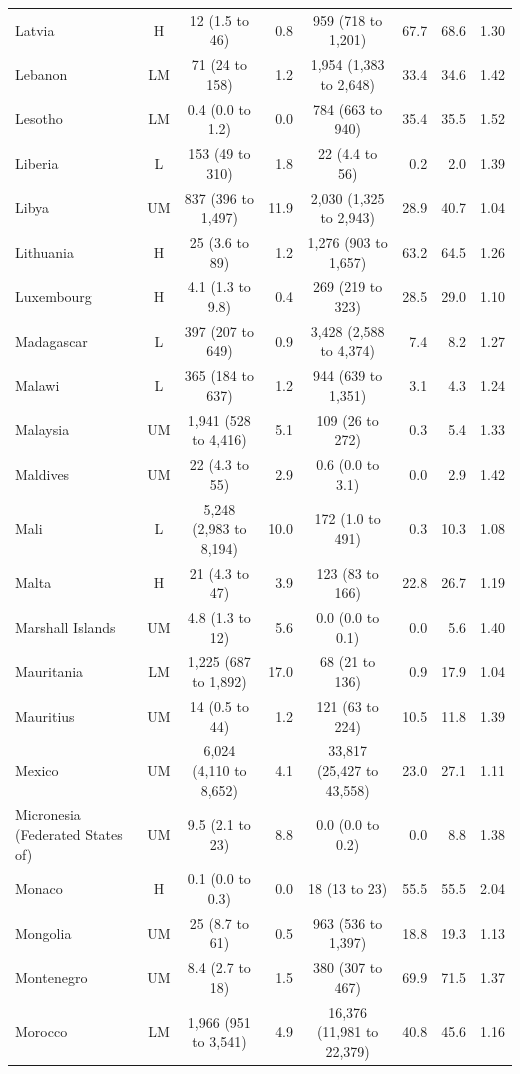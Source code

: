 \begin{longtable}{lccrcrrr}
Latvia & H & 12 (1.5 to 46) & 0.8 & 959 (718 to 1,201) & 67.7 & 68.6 & 1.30 \\
Lebanon & LM & 71 (24 to 158) & 1.2 & 1,954 (1,383 to 2,648) & 33.4 & 34.6 & 1.42 \\
Lesotho & LM & 0.4 (0.0 to 1.2) & 0.0 & 784 (663 to 940) & 35.4 & 35.5 & 1.52 \\
Liberia & L & 153 (49 to 310) & 1.8 & 22 (4.4 to 56) & 0.2 & 2.0 & 1.39 \\
Libya & UM & 837 (396 to 1,497) & 11.9 & 2,030 (1,325 to 2,943) & 28.9 & 40.7 & 1.04 \\
Lithuania & H & 25 (3.6 to 89) & 1.2 & 1,276 (903 to 1,657) & 63.2 & 64.5 & 1.26 \\
Luxembourg & H & 4.1 (1.3 to 9.8) & 0.4 & 269 (219 to 323) & 28.5 & 29.0 & 1.10 \\
Madagascar & L & 397 (207 to 649) & 0.9 & 3,428 (2,588 to 4,374) & 7.4 & 8.2 & 1.27 \\
Malawi & L & 365 (184 to 637) & 1.2 & 944 (639 to 1,351) & 3.1 & 4.3 & 1.24 \\
Malaysia & UM & 1,941 (528 to 4,416) & 5.1 & 109 (26 to 272) & 0.3 & 5.4 & 1.33 \\
Maldives & UM & 22 (4.3 to 55) & 2.9 & 0.6 (0.0 to 3.1) & 0.0 & 2.9 & 1.42 \\
Mali & L & 5,248 (2,983 to 8,194) & 10.0 & 172 (1.0 to 491) & 0.3 & 10.3 & 1.08 \\
Malta & H & 21 (4.3 to 47) & 3.9 & 123 (83 to 166) & 22.8 & 26.7 & 1.19 \\
Marshall Islands & UM & 4.8 (1.3 to 12) & 5.6 & 0.0 (0.0 to 0.1) & 0.0 & 5.6 & 1.40 \\
Mauritania & LM & 1,225 (687 to 1,892) & 17.0 & 68 (21 to 136) & 0.9 & 17.9 & 1.04 \\
Mauritius & UM & 14 (0.5 to 44) & 1.2 & 121 (63 to 224) & 10.5 & 11.8 & 1.39 \\
Mexico & UM & 6,024 (4,110 to 8,652) & 4.1 & 33,817 (25,427 to 43,558) & 23.0 & 27.1 & 1.11 \\
Micronesia (Federated States of) & UM & 9.5 (2.1 to 23) & 8.8 & 0.0 (0.0 to 0.2) & 0.0 & 8.8 & 1.38 \\
Monaco & H & 0.1 (0.0 to 0.3) & 0.0 & 18 (13 to 23) & 55.5 & 55.5 & 2.04 \\
Mongolia & UM & 25 (8.7 to 61) & 0.5 & 963 (536 to 1,397) & 18.8 & 19.3 & 1.13 \\
Montenegro & UM & 8.4 (2.7 to 18) & 1.5 & 380 (307 to 467) & 69.9 & 71.5 & 1.37 \\
Morocco & LM & 1,966 (951 to 3,541) & 4.9 & 16,376 (11,981 to 22,379) & 40.8 & 45.6 & 1.16 \\

\end{longtable}
